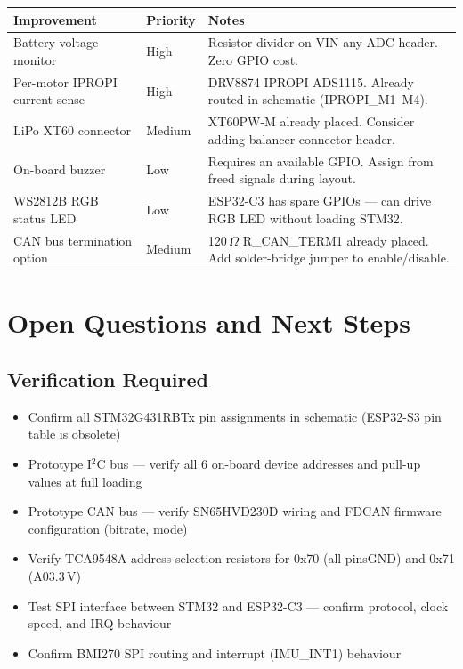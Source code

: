 \documentclass[11pt,a4paper]{article}
\begin{document}
\begin{longtable}{p{4cm} p{2cm} p{9cm}}
  \toprule
  \rowcolor{headergray}\color{white}\textbf{Improvement} &
  \color{white}\textbf{Priority} &
  \color{white}\textbf{Notes} \\
  \midrule\endhead
  Battery voltage monitor & High & Resistor divider on VIN \textrightarrow{} any ADC header. Zero GPIO cost. \\
  Per-motor IPROPI current sense & High & DRV8874 IPROPI \textrightarrow{} ADS1115. Already routed in schematic (IPROPI\_M1--M4). \\
  LiPo XT60 connector & Medium & XT60PW-M already placed. Consider adding balancer connector header. \\
  On-board buzzer & Low & Requires an available GPIO. Assign from freed signals during layout. \\
  WS2812B RGB status LED & Low & ESP32-C3 has spare GPIOs --- can drive RGB LED without loading STM32. \\
  CAN bus termination option & Medium & 120\,$\Omega$ R\_CAN\_TERM1 already placed. Add solder-bridge jumper to enable/disable. \\
  \bottomrule
\end{longtable}

\section{Open Questions and Next Steps}

\subsection{Verification Required}

\begin{itemize}
  \item Confirm all STM32G431RBTx pin assignments in schematic (ESP32-S3 pin table is obsolete)
  \item Prototype I$^2$C bus --- verify all 6 on-board device addresses and pull-up values at full loading
  \item Prototype CAN bus --- verify SN65HVD230D wiring and FDCAN firmware configuration (bitrate, mode)
  \item Verify TCA9548A address selection resistors for 0x70 (all pins\textrightarrow{}GND) and 0x71 (A0\textrightarrow{}3.3\,V)
  \item Test SPI interface between STM32 and ESP32-C3 --- confirm protocol, clock speed, and IRQ behaviour
  \item Confirm BMI270 SPI routing and interrupt (IMU\_INT1) behaviour
\end{itemize}
\end{document}
